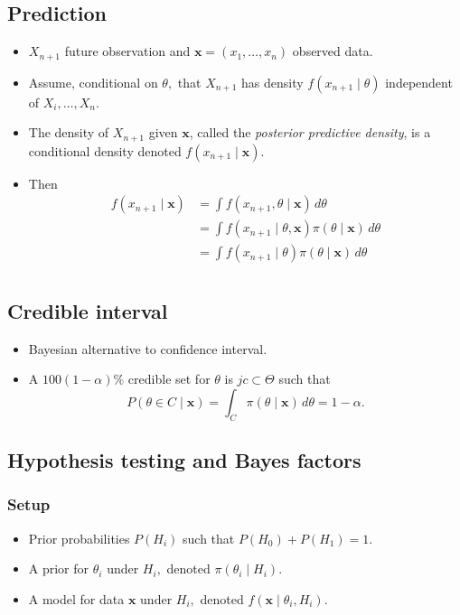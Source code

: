 \subsection{Prediction}
\begin{itemize}
	\item $X_{n+1}$ future observation and $\mathbf{x} = (x_1, \ldots, x_n)$ observed data.
	\item Assume, conditional on $\theta,$ that $X_{n+1}$ has density $f(x_{n+1} \mid \theta)$ independent of $X_i,\ldots,X_n.$
	\item The density of $X_{n+1}$ given $\mathbf{x}$, called the \textit{posterior predictive density}, is a conditional density denoted $f(x_{n+1} \mid \mathbf{x}).$
	\item Then
	\begin{align*}
		f(x_{n+1} \mid \mathbf{x})
		   &= \int f(x_{n+1},\theta \mid \mathbf{x})\,d\theta\\
		   &= \int f(x_{n+1} \mid \theta, \mathbf{x})\pi(\theta \mid \mathbf{x})\,d\theta\\
		   &= \int f(x_{n+1} \mid \theta)\pi(\theta \mid \mathbf{x})\,d\theta\\
	\end{align*}
\end{itemize}

\subsection{Credible interval}
\begin{itemize}
	\item Bayesian alternative to confidence interval.
	\item A $100(1- \alpha)\%$ credible set for $\theta$ is $jc \subset \Theta$ such that
	\[ P(\theta \in C \mid \mathbf{x}) = \int_C \pi (\theta \mid \mathbf{x})\,d\theta = 1-\alpha.\]
\end{itemize}

\subsection{Hypothesis testing and Bayes factors}

\subsubsection{Setup}
\begin{itemize}
	\item Prior probabilities $P(H_i)$ such that $P(H_0) + P(H_1) = 1.$
	\item A prior for $\theta_i$ under $H_i,$ denoted $\pi(\theta_i \mid H_i).$
	\item A model for data $\mathbf{x}$ under $H_i,$ denoted $f(\mathbf{x} \mid \theta_i,H_i).$
\end{itemize}


